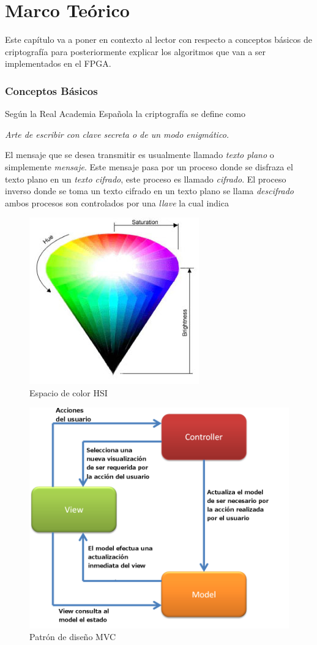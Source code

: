 \chapter{Marco Teórico}

Este capítulo va a poner en contexto al lector con respecto a conceptos básicos de criptografía para posteriormente explicar los algoritmos que van a ser implementados en el FPGA.

\subsection{Conceptos Básicos}
Según la Real Academia Española la criptografía se define como 

\emph{Arte de escribir con clave secreta o de un modo enigmático.}


El mensaje que se desea transmitir es usualmente llamado \textit{texto plano} o simplemente \textit{mensaje}. Este mensaje pasa por un proceso donde se disfraza el texto plano en un \textit{texto cifrado}, este proceso es llamado \textit{cifrado}. El proceso inverso donde se toma un texto cifrado en un texto plano se llama \textit{descifrado} ambos procesos son controlados por una \textit{llave} la cual indica 



\begin{figure}
	\includegraphics[width=0.4\linewidth]{images/hsb}
	\caption{Espacio de color HSI} \label{fig:hsb}
\end{figure}
\begin{figure}
	\includegraphics[width=1\linewidth]{images/mvcbase}
	\caption{Patrón de diseño MVC} \label{fig:mvc}
\end{figure}

